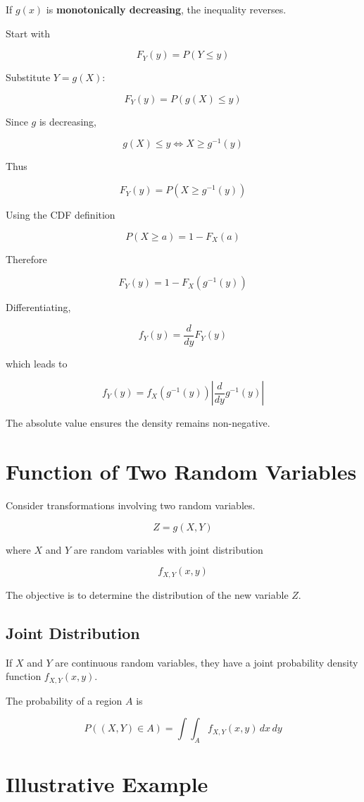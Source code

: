 \documentclass[12pt]{article}
\begin{document}
If $g(x)$ is \textbf{monotonically decreasing}, the inequality reverses.

Start with

\[
F_Y(y) = P(Y \le y)
\]

Substitute $Y = g(X)$:

\[
F_Y(y) = P(g(X) \le y)
\]

Since $g$ is decreasing,

\[
g(X) \le y \iff X \ge g^{-1}(y)
\]

Thus

\[
F_Y(y) = P(X \ge g^{-1}(y))
\]

Using the CDF definition

\[
P(X \ge a) = 1 - F_X(a)
\]

Therefore

\[
F_Y(y) = 1 - F_X(g^{-1}(y))
\]

Differentiating,

\[
f_Y(y) = \frac{d}{dy}F_Y(y)
\]

which leads to

\[
f_Y(y) = f_X(g^{-1}(y))
\left|\frac{d}{dy}g^{-1}(y)\right|
\]

The absolute value ensures the density remains non-negative.

\section{Function of Two Random Variables}

Consider transformations involving two random variables.

\[
Z = g(X,Y)
\]

where $X$ and $Y$ are random variables with joint distribution

\[
f_{X,Y}(x,y)
\]

The objective is to determine the distribution of the new variable $Z$.

\subsection{Joint Distribution}

If $X$ and $Y$ are continuous random variables, they have a joint probability density function $f_{X,Y}(x,y)$.

The probability of a region $A$ is

\[
P((X,Y)\in A) =
\int\int_A f_{X,Y}(x,y)\,dx\,dy
\]

\section{Illustrative Example}
\end{document}
